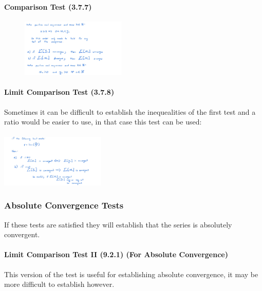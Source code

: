 \documentclass[class=article, crop=false]{standalone}
\begin{document}
\hypertarget{header-n3248}{%
\paragraph{Comparison Test (3.7.7)}\label{header-n3248}}

\begin{figure}
\centering
\includegraphics[width=5cm]{media/InfSeries/FD08303A-128F-49B5-80ED-4EBD48B1A48F.jpeg}
\caption{}
\end{figure}

\hypertarget{header-n3250}{%
\paragraph{Limit Comparison Test (3.7.8)}\label{header-n3250}}

Sometimes it can be difficult to establish the inequealities of the
first test and a ratio would be easier to use, in that case this test
can be used:
\ \\
\ \\
\includegraphics[width=5cm]{media/InfSeries/67331FF8-C7AD-4BE3-ADAE-2D291C4A5D89.jpeg}

\hypertarget{header-n3253}{%
\subsubsection{Absolute Convergence Tests}\label{header-n3253}}

If these tests are satisfied they will establish that the series is
absolutely convergent.

\hypertarget{header-n3255}{%
\paragraph{Limit Comparison Test II (9.2.1) (For Absolute
Convergence)}\label{header-n3255}}

This version of the test is useful for establishing absolute
convergence, it may be more difficult to establish however.
\end{document}
